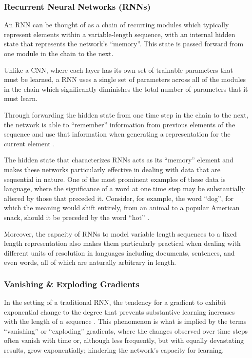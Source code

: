 \documentclass[../../fyp.tex]{subfiles}
\begin{document}

\subsubsection{Recurrent Neural Networks (RNNs)}
An RNN can be thought of as a chain of recurring modules which typically represent elements within a variable-length sequence, with an internal hidden state that represents the network's \enquote{memory}. This state is passed forward from one module in the chain to the next.

Unlike a CNN, where each layer has its own set of trainable parameters that must be learned, a RNN uses a single set of parameters across all of the modules in the chain which significantly diminishes the total number of parameters that it must learn.

Through forwarding the hidden state from one time step in the chain to the next, the network is able to \enquote{remember} information from previous elements of the sequence and use that information when generating a representation for the current element \cite{tang2016b}.

The hidden state that characterizes RNNs acts as its \enquote{memory} element and makes these networks particularly effective in dealing with data that are sequential in nature. One of the most prominent examples of these data is language, where the significance of a word at one time step may be substantially altered by those that preceded it. Consider, for example, the word \enquote{dog}, for which the meaning would shift entirely, from an animal to a popular American snack, should it be preceded by the word \enquote{hot} \cite{young2017}.

Moreover, the capacity of RNNs to model variable length sequences to a fixed length representation also makes them particularly practical when dealing with different units of resolution in languages including documents, sentences, and even words, all of which are naturally arbitrary in length. \cite{tang}

\subsubsection{Vanishing \& Exploding Gradients}
In the setting of a traditional RNN, the tendency for a gradient to exhibit exponential change to the degree that prevents substantive learning increases with the length of a sequence \cite{bengio1994} \cite{hochreiter1997}. This phenomenon is what is implied by the terms \enquote{vanishing} or \enquote{exploding} gradients, where the changes observed over time steps often vanish with time or, although less frequently, but with equally devastating results, grow exponentially; hindering the network's capacity for learning.
\end{document}
